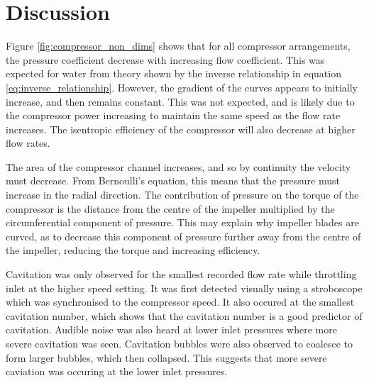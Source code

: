 \documentclass{article}
\begin{document}


\section{Discussion}

Figure \ref{fig:compressor_non_dims} shows that for all compressor arrangements, the pressure coefficient decrease with increasing flow coefficient.
This was expected for water from theory shown by the inverse relationship in equation \ref{eq:inverse_relationship}.
However, the gradient of the curves appears to initially increase, and then remains constant.
This was not expected, and is likely due to the compressor power increasing to maintain the same speed as the flow rate increases.
The isentropic efficiency of the compressor will also decrease at higher flow rates.

The area of the compressor channel increases, and so by continuity the velocity must decrease.
From Bernoulli's equation, this means that the pressure must increase in the radial direction.
The contribution of pressure on the torque of the compressor is the distance from the centre of the impeller multiplied by the circumferential component of pressure.
This may explain why impeller blades are curved, as to decrease this component of pressure further away from the centre of the impeller, reducing the torque and increasing efficiency.




Cavitation was only observed for the smallest recorded flow rate while throttling inlet at the higher speed setting.
It was first detected visually using a stroboscope which was synchronised to the compressor speed.
It also occured at the smallest cavitation number, which shows that the cavitation number is a good predictor of cavitation.
Audible noise was also heard at lower inlet pressures where more severe cavitation was seen.
Cavitation bubbles were also observed to coalesce to form larger bubbles, which then collapsed.
This suggests that more severe caviation was occuring at the lower inlet pressures.
\end{document}
